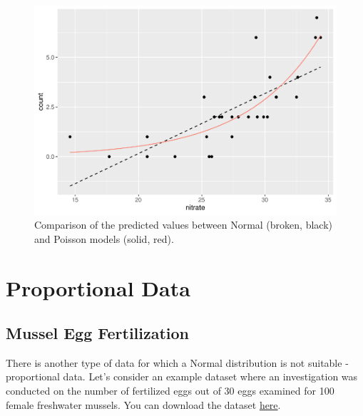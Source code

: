 \documentclass[
]{book}
\begin{document}
\begin{figure}

{\centering \includegraphics{biostats_files/figure-latex/normal-pois-1} 

}

\caption{Comparison of the predicted values between Normal (broken, black) and Poisson models (solid, red).}\label{fig:normal-pois}
\end{figure}

\hypertarget{proportional-data}{%
\section{Proportional Data}\label{proportional-data}}

\hypertarget{mussel-egg-fertilization}{%
\subsection{Mussel Egg Fertilization}\label{mussel-egg-fertilization}}

There is another type of data for which a Normal distribution is not suitable - proportional data. Let's consider an example dataset where an investigation was conducted on the number of fertilized eggs out of 30 eggs examined for 100 female freshwater mussels. You can download the dataset \href{https://github.com/aterui/biostats/blob/master/data_raw/data_mussel.csv}{here}.
\end{document}
